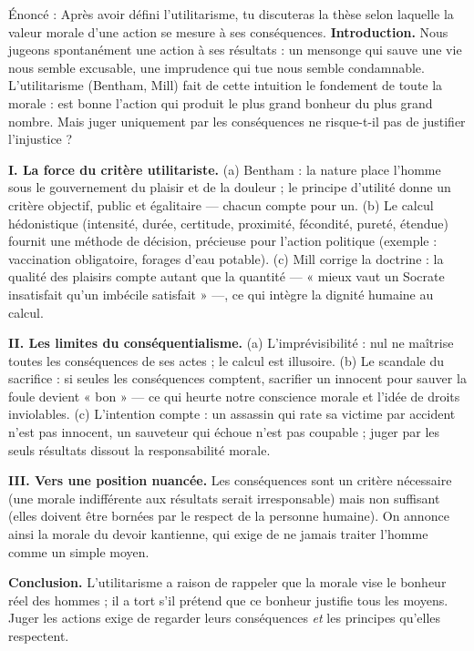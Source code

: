 \documentclass[11pt]{article}
\begin{document}
\begin{exoresolu}
Énoncé : Après avoir défini l'utilitarisme, tu discuteras la thèse selon laquelle la valeur morale d'une action se mesure à ses conséquences.
\tcblower
\textbf{Introduction.} Nous jugeons spontanément une action à ses résultats : un mensonge qui sauve une vie nous semble excusable, une imprudence qui tue nous semble condamnable. L'utilitarisme (Bentham, Mill) fait de cette intuition le fondement de toute la morale : est bonne l'action qui produit le plus grand bonheur du plus grand nombre. Mais juger uniquement par les conséquences ne risque-t-il pas de justifier l'injustice ?

\textbf{I. La force du critère utilitariste.} (a) Bentham : la nature place l'homme sous le gouvernement du plaisir et de la douleur ; le principe d'utilité donne un critère objectif, public et égalitaire — chacun compte pour un. (b) Le calcul hédonistique (intensité, durée, certitude, proximité, fécondité, pureté, étendue) fournit une méthode de décision, précieuse pour l'action politique (exemple : vaccination obligatoire, forages d'eau potable). (c) Mill corrige la doctrine : la qualité des plaisirs compte autant que la quantité — « mieux vaut un Socrate insatisfait qu'un imbécile satisfait » —, ce qui intègre la dignité humaine au calcul.

\textbf{II. Les limites du conséquentialisme.} (a) L'imprévisibilité : nul ne maîtrise toutes les conséquences de ses actes ; le calcul est illusoire. (b) Le scandale du sacrifice : si seules les conséquences comptent, sacrifier un innocent pour sauver la foule devient « bon » — ce qui heurte notre conscience morale et l'idée de droits inviolables. (c) L'intention compte : un assassin qui rate sa victime par accident n'est pas innocent, un sauveteur qui échoue n'est pas coupable ; juger par les seuls résultats dissout la responsabilité morale.

\textbf{III. Vers une position nuancée.} Les conséquences sont un critère nécessaire (une morale indifférente aux résultats serait irresponsable) mais non suffisant (elles doivent être bornées par le respect de la personne humaine). On annonce ainsi la morale du devoir kantienne, qui exige de ne jamais traiter l'homme comme un simple moyen.

\textbf{Conclusion.} L'utilitarisme a raison de rappeler que la morale vise le bonheur réel des hommes ; il a tort s'il prétend que ce bonheur justifie tous les moyens. Juger les actions exige de regarder leurs conséquences \emph{et} les principes qu'elles respectent.
\end{exoresolu}
\end{document}
